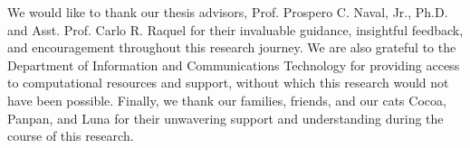 
We would like to thank our thesis advisors, Prof. Prospero C. Naval, Jr., Ph.D. and Asst. Prof. Carlo R. Raquel for their 
invaluable guidance, insightful feedback, and encouragement throughout
this research journey. We are also grateful to the Department of Information and Communications Technology
for providing access to computational resources and support, without which this research would not have been possible. Finally, we thank our families, friends, 
and our cats Cocoa, Panpan, and Luna for their unwavering support and understanding during the course of this research.